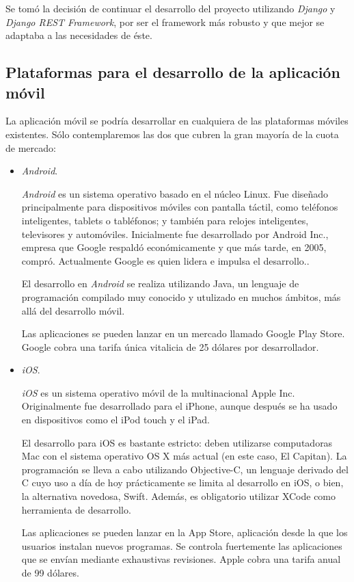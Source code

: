 Se tomó la decisión de continuar el desarrollo del proyecto utilizando
\textit{Django} y \textit{Django REST Framework}, por ser el framework más
robusto y que mejor se adaptaba a las necesidades de éste.


\subsection{Plataformas para el desarrollo de la aplicación móvil}

La aplicación móvil se podría desarrollar en cualquiera de las plataformas
móviles existentes. Sólo contemplaremos las dos que cubren la gran mayoría de
la cuota de mercado:

\begin{itemize}
\item \textit{Android}.~\cite{android}

\textit{Android} es un sistema operativo basado en el núcleo Linux. Fue diseñado
principalmente para dispositivos móviles con pantalla táctil, como teléfonos
inteligentes, tablets o tabléfonos; y también para relojes inteligentes,
televisores y automóviles. Inicialmente fue desarrollado por Android Inc.,
empresa que Google respaldó económicamente y que más tarde, en 2005, compró.
Actualmente Google es quien lidera e impulsa el desarrollo..

El desarrollo en \textit{Android} se realiza utilizando Java, un lenguaje de
programación compilado muy conocido y utulizado en muchos ámbitos, más allá del
desarrollo móvil.

Las aplicaciones se pueden lanzar en un mercado llamado Google Play Store.
Google cobra una tarifa única vitalicia de 25 dólares por desarrollador.

\item \textit{iOS}.~\cite{ios}

\textit{iOS} es un sistema operativo móvil de la multinacional Apple Inc.
Originalmente fue desarrollado para el iPhone, aunque después se ha usado en
dispositivos como el iPod touch y el iPad.

El desarrollo para iOS es bastante estricto: deben utilizarse computadoras Mac
con el sistema operativo OS X más actual (en este caso, El Capitan). La
programación se lleva a cabo utilizando Objective-C, un lenguaje derivado del C
cuyo uso a día de hoy prácticamente se limita al desarrollo en iOS, o bien, la
alternativa novedosa, Swift. Además, es obligatorio  utilizar XCode como
herramienta de desarrollo.

Las aplicaciones se pueden lanzar en la App Store, aplicación desde la que los
usuarios instalan nuevos programas. Se controla fuertemente las aplicaciones que
se envían mediante exhaustivas revisiones. Apple cobra una tarifa anual de 99
dólares.

\end{itemize}

